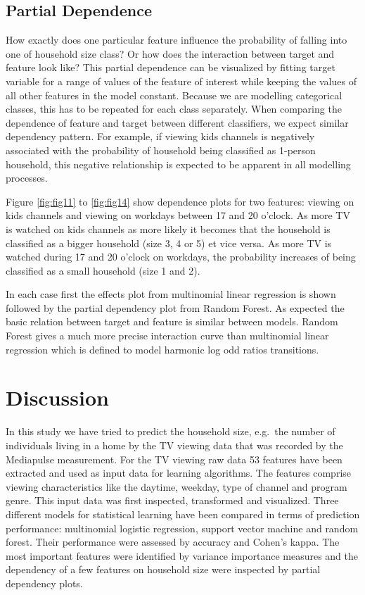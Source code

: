 \documentclass[]{article}
\begin{document}
\hypertarget{partial-dependence}{%
\subsection{Partial Dependence}\label{partial-dependence}}

How exactly does one particular feature influence the probability of
falling into one of household size class? Or how does the interaction
between target and feature look like? This partial dependence can be
visualized by fitting target variable for a range of values of the
feature of interest while keeping the values of all other features in
the model constant. Because we are modelling categorical classes, this
has to be repeated for each class separately. When comparing the
dependence of feature and target between different classifiers, we
expect similar dependency pattern. For example, if viewing kids channels
is negatively associated with the probability of household being
classified as 1-person household, this negative relationship is expected
to be apparent in all modelling processes.

Figure \ref{fig:fig11} to \ref{fig:fig14} show dependence plots for two
features: viewing on kids channels and viewing on workdays between 17
and 20 o'clock. As more TV is watched on kids channels as more likely it
becomes that the household is classified as a bigger household (size 3,
4 or 5) et vice versa. As more TV is watched during 17 and 20 o'clock on
workdays, the probability increases of being classified as a small
household (size 1 and 2).

In each case first the effects plot from multinomial linear regression
is shown followed by the partial dependency plot from Random Forest. As
expected the basic relation between target and feature is similar
between models. Random Forest gives a much more precise interaction
curve than multinomial linear regression which is defined to model
harmonic log odd ratios transitions.

\hypertarget{discussion}{%
\section{Discussion}\label{discussion}}

In this study we have tried to predict the household size, e.g.~the
number of individuals living in a home by the TV viewing data that was
recorded by the Mediapulse measurement. For the TV viewing raw data 53
features have been extracted and used as input data for learning
algorithms. The features comprise viewing characteristics like the
daytime, weekday, type of channel and program genre. This input data was
first inspected, transformed and visualized. Three different models for
statistical learning have been compared in terms of prediction
performance: multinomial logistic regression, support vector machine and
random forest. Their performance were assessed by accuracy and Cohen's
kappa. The most important features were identified by variance
importance measures and the dependency of a few features on household
size were inspected by partial dependency plots.
\end{document}
